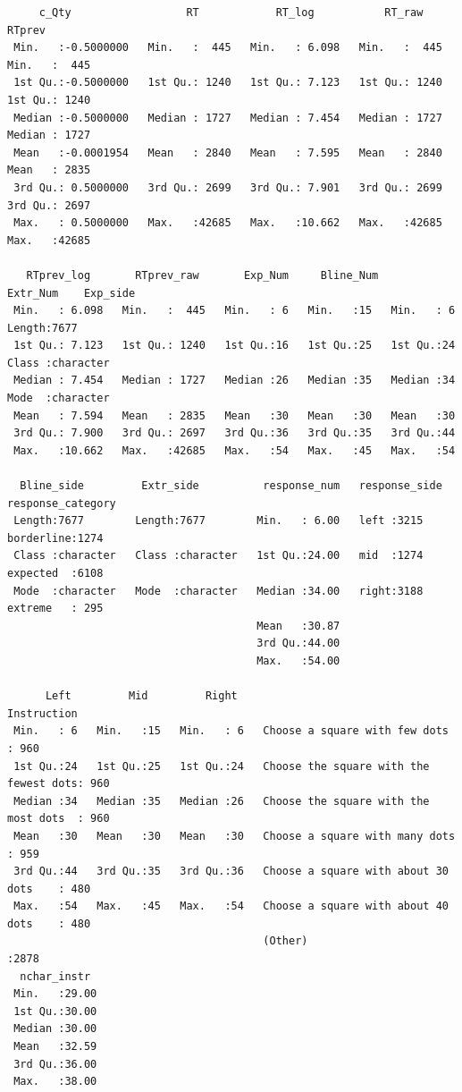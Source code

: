 \documentclass[a4paper,12pt]{article}\usepackage[]{graphicx}\usepackage[]{color}
\makeatletter
\newenvironment{kframe}{%
 \def\at@end@of@kframe{}%
 \ifinner\ifhmode%
  \def\at@end@of@kframe{\end{minipage}}%
  \begin{minipage}{\columnwidth}%
 \fi\fi%
 \def\FrameCommand##1{\hskip\@totalleftmargin \hskip-\fboxsep
 \colorbox{shadecolor}{##1}\hskip-\fboxsep
     \hskip-\linewidth \hskip-\@totalleftmargin \hskip\columnwidth}%
 \MakeFramed {\advance\hsize-\width
   \@totalleftmargin\z@ \linewidth\hsize
   \@setminipage}}%
 {\par\unskip\endMakeFramed%
 \at@end@of@kframe}
\newenvironment{knitrout}{}{} %
\makeatother
\begin{document}
\begin{knitrout}
\begin{kframe}
\begin{verbatim}
     c_Qty                  RT            RT_log           RT_raw          RTprev     
 Min.   :-0.5000000   Min.   :  445   Min.   : 6.098   Min.   :  445   Min.   :  445  
 1st Qu.:-0.5000000   1st Qu.: 1240   1st Qu.: 7.123   1st Qu.: 1240   1st Qu.: 1240  
 Median :-0.5000000   Median : 1727   Median : 7.454   Median : 1727   Median : 1727  
 Mean   :-0.0001954   Mean   : 2840   Mean   : 7.595   Mean   : 2840   Mean   : 2835  
 3rd Qu.: 0.5000000   3rd Qu.: 2699   3rd Qu.: 7.901   3rd Qu.: 2699   3rd Qu.: 2697  
 Max.   : 0.5000000   Max.   :42685   Max.   :10.662   Max.   :42685   Max.   :42685  
                                                                                      
   RTprev_log       RTprev_raw       Exp_Num     Bline_Num     Extr_Num    Exp_side        
 Min.   : 6.098   Min.   :  445   Min.   : 6   Min.   :15   Min.   : 6   Length:7677       
 1st Qu.: 7.123   1st Qu.: 1240   1st Qu.:16   1st Qu.:25   1st Qu.:24   Class :character  
 Median : 7.454   Median : 1727   Median :26   Median :35   Median :34   Mode  :character  
 Mean   : 7.594   Mean   : 2835   Mean   :30   Mean   :30   Mean   :30                     
 3rd Qu.: 7.900   3rd Qu.: 2697   3rd Qu.:36   3rd Qu.:35   3rd Qu.:44                     
 Max.   :10.662   Max.   :42685   Max.   :54   Max.   :45   Max.   :54                     
                                                                                           
  Bline_side         Extr_side          response_num   response_side  response_category
 Length:7677        Length:7677        Min.   : 6.00   left :3215    borderline:1274   
 Class :character   Class :character   1st Qu.:24.00   mid  :1274    expected  :6108   
 Mode  :character   Mode  :character   Median :34.00   right:3188    extreme   : 295   
                                       Mean   :30.87                                   
                                       3rd Qu.:44.00                                   
                                       Max.   :54.00                                   
                                                                                       
      Left         Mid         Right                                    Instruction  
 Min.   : 6   Min.   :15   Min.   : 6   Choose a square with few dots         : 960  
 1st Qu.:24   1st Qu.:25   1st Qu.:24   Choose the square with the fewest dots: 960  
 Median :34   Median :35   Median :26   Choose the square with the most dots  : 960  
 Mean   :30   Mean   :30   Mean   :30   Choose a square with many dots        : 959  
 3rd Qu.:44   3rd Qu.:35   3rd Qu.:36   Choose a square with about 30 dots    : 480  
 Max.   :54   Max.   :45   Max.   :54   Choose a square with about 40 dots    : 480  
                                        (Other)                               :2878  
  nchar_instr   
 Min.   :29.00  
 1st Qu.:30.00  
 Median :30.00  
 Mean   :32.59  
 3rd Qu.:36.00  
 Max.   :38.00  
                
\end{verbatim}
\end{kframe}
\end{knitrout}
\end{document}
